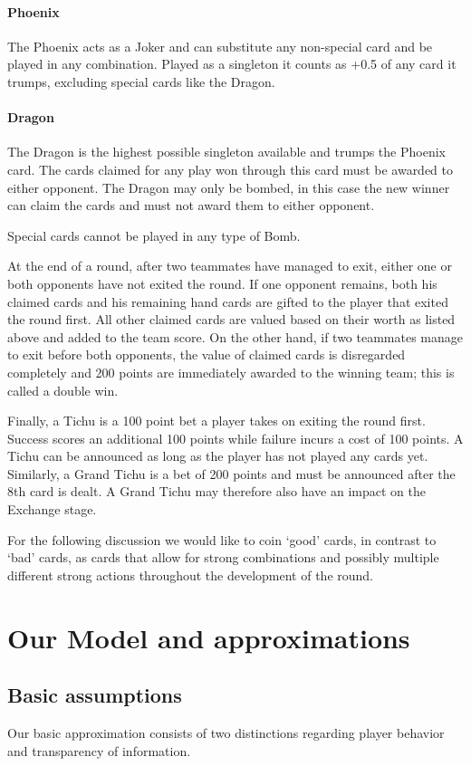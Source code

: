 \paragraph*{Phoenix}
The Phoenix acts as a Joker and can substitute any non-special card and be played in any combination. Played as a singleton it counts as +0.5 of any card it trumps, excluding special cards like the Dragon.
\paragraph{Dragon}
The Dragon is the highest possible singleton available and trumps the Phoenix card. The cards claimed for any play won through this card must be awarded to either opponent. The Dragon may only be bombed, in this case the new winner can claim the cards and must not award them to either opponent.

Special cards cannot be played in any type of Bomb.

At the end of a round, after two teammates have managed to exit, either one or both opponents have not exited the round. If one opponent remains, both his claimed cards and his remaining hand cards are gifted to the player that exited the round first. All other claimed cards are valued based on their worth as listed above and added to the team score. On the other hand, if two teammates manage to exit before both opponents, the value of claimed cards is disregarded completely and 200 points are immediately awarded to the winning team; this is called a double win.

Finally, a Tichu is a 100 point bet a player takes on exiting the round first. Success scores an additional 100 points while failure incurs a cost of 100 points. A Tichu can be announced as long as the player has not played any cards yet. Similarly, a Grand Tichu is a bet of 200 points and must be announced after the 8th card is dealt. A Grand Tichu may therefore also have an impact on the Exchange stage.

For the following discussion we would like to coin ‘good’ cards, in contrast to ‘bad’ cards, as cards that allow for strong combinations and possibly multiple different strong actions throughout the development of the round.


\section{Our Model and approximations}
\subsection{Basic assumptions}
Our basic approximation consists of two distinctions regarding player behavior and transparency of information. 

